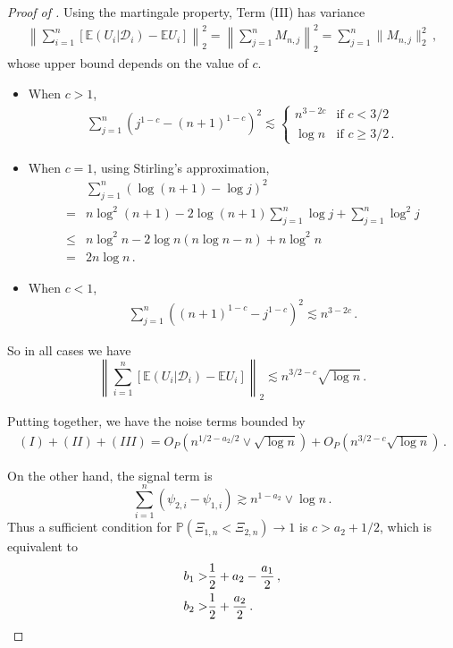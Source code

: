 \documentclass[11pt]{article}
\theoremstyle{plain}
\newcommand{\D}{{\mathcal{D}}}
\begin{document}
\begin{proof}[Proof of ]
Using the martingale property, Term (III) has variance
\begin{align*}
    \left\|\sum_{i=1}^n  \left[\mathbb E(U_i|\D_i)-\mathbb E U_i\right]\right\|_2^2 =  \left\|\sum_{j=1}^n M_{n,j}\right\|_2^2=\sum_{j=1}^n \|M_{n,j}\|_2^2\,,
\end{align*}
whose upper bound depends on the value of $c$.
\begin{itemize}
    \item When $c>1$,
    \begin{align*}
        \sum_{j=1}^n(j^{1-c}-(n+1)^{1-c})^2
        \lesssim \left\{\begin{array}{ll}
            n^{3-2c} & \text{if } c<3/2 \\
            \log n & \text{if } c\ge 3/2\,.
        \end{array}\right. 
    \end{align*}
    \item When $c=1$, using Stirling's approximation,
    \begin{align*}
        &\sum_{j=1}^n (\log(n+1)-\log j)^2\\
        =&n\log^2(n+1) - 2\log(n+1)\sum_{j=1}^n\log j+\sum_{j=1}^n \log^2j\\
        \le & n \log^2 n - 2\log n(n\log n-n)+n\log^2 n\\
        = & 2n\log n\,.
    \end{align*}
    \item When $c<1$,
    \begin{align*}
        \sum_{j=1}^n((n+1)^{1-c}-j^{1-c})^2\lesssim n^{3-2c}\,.
    \end{align*}
\end{itemize}
So in all cases we have
$$\left\|\sum_{i=1}^n  \left[\mathbb E(U_i|\D_i)-\mathbb E U_i\right]\right\|_2\lesssim n^{3/2-c}\sqrt{\log n}\,.$$

Putting together, we have the noise terms bounded by
\begin{align*}
    (I)+(II)+(III) = O_P(n^{1/2-a_2/2}\vee\sqrt{\log n})+O_P(n^{3/2-c}\sqrt{\log n})\,.
\end{align*}

On the other hand, the signal term is
$$
\sum_{i=1}^n (\psi_{2,i}-\psi_{1,i})\gtrsim n^{1-a_2}\vee\log  n\,.
$$
Thus a sufficient condition for $\mathbb P(\Xi_{1,n}<\Xi_{2,n})\rightarrow 1$ is $c>a_2+1/2$, which is equivalent to
\begin{align*}
    b_1> &\frac{1}{2}+a_2-\frac{a_1}{2}\,,  \\
    b_2> & \frac{1}{2}+\frac{a_2}{2} \,.\qedhere
\end{align*}
\end{proof}
\end{document}
